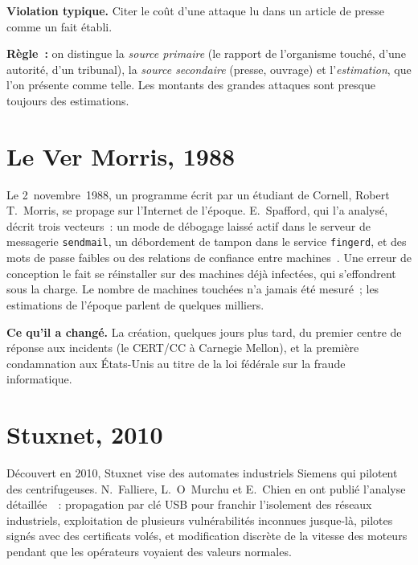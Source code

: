 \begin{boxalert}
\textbf{Violation typique.} Citer le coût d'une attaque lu dans un article
de presse comme un fait établi.

\smallskip
\textbf{Règle~:} on distingue la \emph{source primaire} (le rapport de
l'organisme touché, d'une autorité, d'un tribunal), la \emph{source
secondaire} (presse, ouvrage) et l'\emph{estimation}, que l'on présente
comme telle. Les montants des grandes attaques sont presque toujours des
estimations.
\end{boxalert}

\section{Le Ver Morris, 1988}
\label{sec:c05-morris}

Le 2~novembre~1988, un programme écrit par un étudiant de Cornell, Robert
T.~Morris, se propage sur l'Internet de l'époque. E.~Spafford, qui l'a
analysé, décrit trois vecteurs~: un mode de débogage laissé actif dans le
serveur de messagerie \texttt{sendmail}, un débordement de tampon dans le
service \texttt{fingerd}, et des mots de passe faibles ou des relations de
confiance entre machines~\cite{spafford1989}. Une erreur de conception le
fait se réinstaller sur des machines déjà infectées, qui s'effondrent sous
la charge. Le nombre de machines touchées n'a jamais été mesuré~; les
estimations de l'époque parlent de quelques milliers.

\textbf{Ce qu'il a changé.} La création, quelques jours plus tard, du
premier centre de réponse aux incidents (le CERT/CC à Carnegie Mellon), et
la première condamnation aux États-Unis au titre de la loi fédérale sur la
fraude informatique.

\section{Stuxnet, 2010}
\label{sec:c05-stuxnet}

Découvert en 2010, Stuxnet vise des automates industriels Siemens qui
pilotent des centrifugeuses. N.~Falliere, L.~O~Murchu et E.~Chien en ont
publié l'analyse détaillée~\cite{falliere2011}~: propagation par clé USB
pour franchir l'isolement des réseaux industriels, exploitation de
plusieurs vulnérabilités inconnues jusque-là, pilotes signés avec des
certificats volés, et modification discrète de la vitesse des moteurs
pendant que les opérateurs voyaient des valeurs normales.

